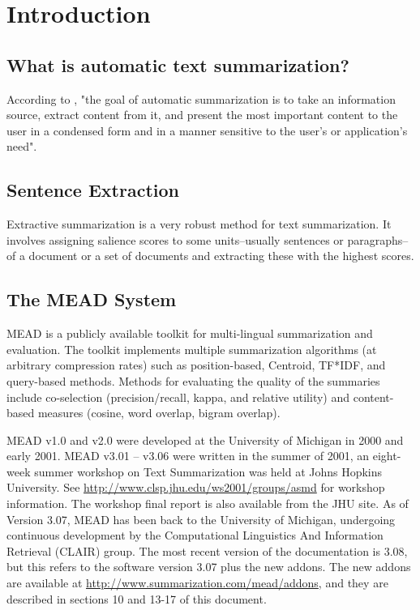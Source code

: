 \documentclass[10pt]{article}
\begin{document}
\section{Introduction}

\subsection{What is automatic text summarization?}

According to \cite{Mani01a}, "the goal of automatic summarization is
to take an information source, extract content from it, and present
the most important content to the user in a condensed form and in a
manner sensitive to the user's or application's need".

\subsection{Sentence Extraction}

Extractive summarization is a very robust method for text
summarization. It involves assigning salience scores to some
units--usually sentences or paragraphs--of a document or a set of
documents and extracting these with the highest scores.

\subsection{The MEAD System}

MEAD is a publicly available toolkit for multi-lingual summarization
and evaluation.  The toolkit implements multiple summarization
algorithms (at arbitrary compression rates) such as position-based,
Centroid\cite{Radev&al.00b}, TF*IDF, and query-based methods. Methods
for evaluating the quality of the summaries include co-selection
(precision/recall, kappa, and relative utility) and content-based
measures (cosine, word overlap, bigram overlap).

MEAD v1.0 and v2.0 were developed at the University of Michigan in
2000 and early 2001. MEAD v3.01 -- v3.06 were written in the summer of
2001, an eight-week summer workshop on Text Summarization was held at
Johns Hopkins University. See
\url{http://www.clsp.jhu.edu/ws2001/groups/asmd} for workshop
information. The workshop final report \cite{Radev&al.02e} is also
available from the JHU site.  As of Version 3.07, MEAD has been back
to the University of Michigan, undergoing continuous development by
the Computational Linguistics And Information Retrieval (CLAIR) group.
The most recent version of the documentation is 3.08, but this refers
to the software version 3.07 plus the new addons.  The new addons are 
available at \url{http://www.summarization.com/mead/addons}, and they are 
described in sections 10 and 13-17 of this document.
\end{document}
